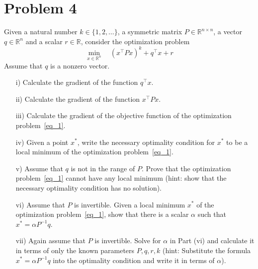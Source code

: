 \section*{Problem 4}
Given a natural number $k \in \{1, 2, \ldots\}$, a symmetric matrix $P\in\mathbb R^{n\times n}$, a vector $q\in\mathbb R^n$ and a scalar $r\in\mathbb R$, consider the optimization problem
\begin{equation}
\label{eq_1}
\min_{x\in\mathbb R^n} \quad (x^\top P x)^k + q^\top x + r 
\end{equation}
Assume that $q$ is a nonzero vector. 
\begin{itemize}
\item [i)] Calculate the gradient of the function $q^\top x$.
\item [ii)] Calculate the gradient of the function $x^\top P x$.
\item [iii)] Calculate the gradient of the objective function of the optimization problem~\eqref{eq_1}.
\item [iv)] Given a point $x^*$, write the necessary optimality condition for $x^*$ to be a local minimum of the optimization problem~\eqref{eq_1}.
\item [v)] Assume that $q$ is not in the range of $P$. Prove that the optimization problem~\eqref{eq_1} cannot have any local minimum (hint: show that the necessary optimality condition has no solution).
\item [vi)] Assume that $P$ is invertible. Given a  local minimum $x^*$ of the optimization problem~\eqref{eq_1}, show that there is a scalar $\alpha$ such that $x^*=\alpha P^{-1}q$. 
\item [vii)] Again assume that $P$ is invertible. Solve for $\alpha$ in Part (vi) and calculate it in terms of only the known parameters $P,q,r,k$ (hint: Substitute the formula $x^*=\alpha P^{-1}q$ into the optimality condition and write it in terms of $\alpha$). 
\end{itemize}